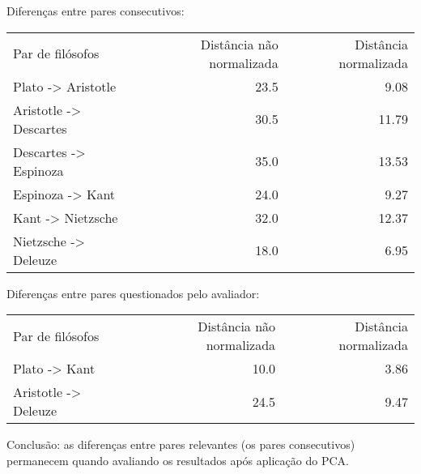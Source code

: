 \documentclass[11pt]{article}
\begin{document}
  Diferenças entre pares consecutivos:


\begin{center}
\begin{tabular}{lrr}
 Par de filósofos        &  Distância não normalizada  &  Distância normalizada  \\
 Plato -> Aristotle      &                       23.5  &                   9.08  \\
 Aristotle -> Descartes  &                       30.5  &                  11.79  \\
 Descartes -> Espinoza   &                       35.0  &                  13.53  \\
 Espinoza -> Kant        &                       24.0  &                   9.27  \\
 Kant -> Nietzsche       &                       32.0  &                  12.37  \\
 Nietzsche -> Deleuze    &                       18.0  &                   6.95  \\
\end{tabular}
\end{center}



  Diferenças entre pares questionados pelo avaliador:


\begin{center}
\begin{tabular}{lrr}
 Par de filósofos      &  Distância não normalizada  &  Distância normalizada  \\
 Plato -> Kant         &                       10.0  &                   3.86  \\
 Aristotle -> Deleuze  &                       24.5  &                   9.47  \\
\end{tabular}
\end{center}



  Conclusão: as diferenças entre pares relevantes (os pares consecutivos) permanecem
  quando avaliando os resultados após aplicação do PCA.
\end{document}
